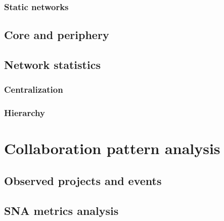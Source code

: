 \subsubsection{Static networks}

\subsection{Core and periphery}

\subsection{Network statistics}
\subsubsection{Centralization}

\subsubsection{Hierarchy}

\section{Collaboration pattern analysis}
\subsection{Observed projects and events}
\subsection{SNA metrics analysis}
